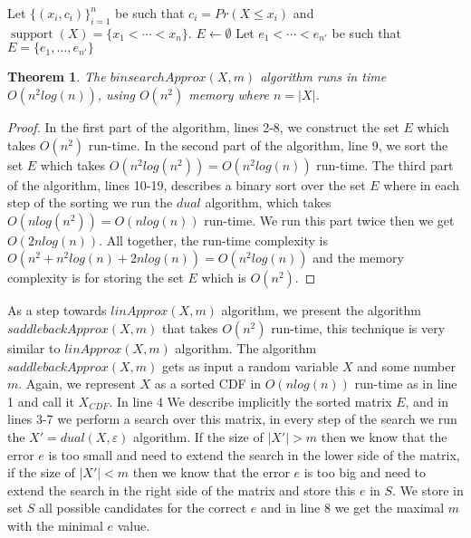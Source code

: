 \documentclass[letterpaper]{article} %
\newtheorem{theorem}[thm]{Theorem}
\DeclareMathOperator{\supp}{support}
\begin{document}
\begin{algorithm}
	\DontPrintSemicolon
	Let $\{(x_i, c_i)\}_{i=1}^n$ be such that $c_i=Pr(X \leq x_i)$ and $\supp(X)=\{x_1 < \cdots < x_n\}$.\;
    $E \gets \emptyset$\; 
    Let $e_1<\cdots<e_{n'}$ be such that $E=\{e_1,\dots,e_{n'}\}$ \;
    

	\caption{$binsearchApprox(X,m)$}   
	\label{alg:naive}
\end{algorithm}

\begin{theorem}\label{the:complexityDual}
	The $binsearchApprox(X,m)$ algorithm runs in time $O(n^2log(n))$, using $O(n^2)$ memory where $n=|X|$.
\end{theorem}
\begin{proof}
	In the first part of the algorithm, lines 2-8, we construct the set $E$ which takes $O(n^2)$ run-time. In the second part of the algorithm, line 9, we sort the set $E$ which takes $O(n^2log(n^2)) = O(n^2log(n))$  run-time. The third part of the algorithm, lines 10-19, describes a binary sort over the set $E$ where in each step of the sorting we run the $dual$ algorithm, which takes $O(n log(n^2)) = O(n log(n))$ run-time. We run this part twice then we get $O(2n log(n))$. All together, the run-time complexity is $O(n^2+n^2log(n)+2n log(n)) = O(n^2log(n))$ and the memory complexity is for storing the set $E$ which is $O(n^2)$.
\end{proof}

As a step towards $linApprox(X,m)$ algorithm, we present the algorithm $saddlebackApprox(X,m)$ that takes $O(n^2)$ run-time, this technique is very similar to $linApprox(X,m)$ algorithm. The algorithm $saddlebackApprox(X,m)$ gets as input a random variable $X$ and some number $m$. Again, we represent $X$ as a sorted CDF in $O(nlog(n))$ run-time as in line 1 and call it $X_{CDF}$. In line 4 We describe implicitly the sorted matrix $E$, and in lines 3-7 we perform a search over this matrix, in every step of the search we run the $X' = dual(X,\varepsilon)$ algorithm. If the size of $|X'|>m$ then we know that the error $e$ is too small and need to extend the search in the lower side of the matrix, if the size of $|X'|<m$ then we know that the error $e$ is too big and need to extend the search in the right side of the matrix and store this $e$ in $S$. We store in set $S$ all possible candidates for the correct $e$ and in line 8 we get the maximal $m$ with the minimal $e$ value.
\end{document}
